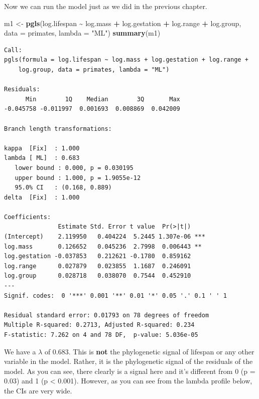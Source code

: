 \documentclass[
]{book}
\newenvironment{Shaded}{\begin{snugshade}}{\end{snugshade}}
\newcommand{\DataTypeTok}[1]{\textcolor[rgb]{0.13,0.29,0.53}{#1}}
\newcommand{\KeywordTok}[1]{\textcolor[rgb]{0.13,0.29,0.53}{\textbf{#1}}}
\newcommand{\NormalTok}[1]{#1}
\newcommand{\OperatorTok}[1]{\textcolor[rgb]{0.81,0.36,0.00}{\textbf{#1}}}
\newcommand{\StringTok}[1]{\textcolor[rgb]{0.31,0.60,0.02}{#1}}
\begin{document}
Now we can run the model just as we did in the previous chapter.

\begin{Shaded}
\begin{Highlighting}[]
\NormalTok{m1 \textless{}{-}}\StringTok{ }\KeywordTok{pgls}\NormalTok{(log.lifespan }\OperatorTok{\textasciitilde{}}\StringTok{ }\NormalTok{log.mass }\OperatorTok{+}\StringTok{ }\NormalTok{log.gestation }\OperatorTok{+}\StringTok{ }\NormalTok{log.range }\OperatorTok{+}\StringTok{ }\NormalTok{log.group,}
           \DataTypeTok{data =}\NormalTok{ primates, }\DataTypeTok{lambda =} \StringTok{"ML"}\NormalTok{)}
\KeywordTok{summary}\NormalTok{(m1)}
\end{Highlighting}
\end{Shaded}

\begin{verbatim}
Call:
pgls(formula = log.lifespan ~ log.mass + log.gestation + log.range + 
    log.group, data = primates, lambda = "ML")

Residuals:
      Min        1Q    Median        3Q       Max 
-0.045758 -0.011997  0.001693  0.008869  0.042009 

Branch length transformations:

kappa  [Fix]  : 1.000
lambda [ ML]  : 0.683
   lower bound : 0.000, p = 0.030195
   upper bound : 1.000, p = 1.9055e-12
   95.0% CI   : (0.168, 0.889)
delta  [Fix]  : 1.000

Coefficients:
               Estimate Std. Error t value  Pr(>|t|)    
(Intercept)    2.119950   0.404224  5.2445 1.307e-06 ***
log.mass       0.126652   0.045236  2.7998  0.006443 ** 
log.gestation -0.037853   0.212621 -0.1780  0.859162    
log.range      0.027879   0.023855  1.1687  0.246091    
log.group      0.028718   0.038070  0.7544  0.452910    
---
Signif. codes:  0 '***' 0.001 '**' 0.01 '*' 0.05 '.' 0.1 ' ' 1

Residual standard error: 0.01793 on 78 degrees of freedom
Multiple R-squared: 0.2713, Adjusted R-squared: 0.234 
F-statistic: 7.262 on 4 and 78 DF,  p-value: 5.036e-05 
\end{verbatim}

We have a \(\lambda\) of 0.683. This is \textbf{not} the phylogenetic signal of lifespan or any other variable in the model. Rather, it is the phylogenetic signal of the residuals of the model. As you can see, there clearly is a signal here and it's different from 0 (p = 0.03) and 1 (p \textless{} 0.001). However, as you can see from the lambda profile below, the CIs are very wide.
\end{document}
